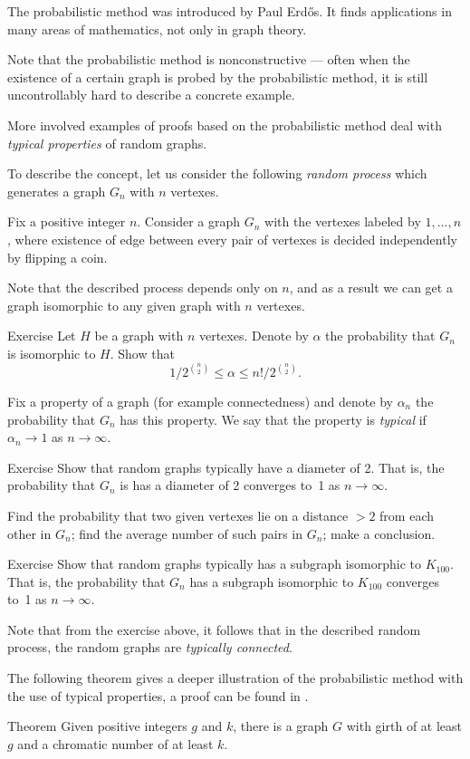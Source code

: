 The probabilistic method was introduced by Paul Erd\H os.
It finds applications in many areas of mathematics, not only in graph theory.

Note that the probabilistic method is nonconstructive ---
often when the existence of a certain graph is probed by the probabilistic method,
it is still uncontrollably hard to describe a concrete example.

More involved examples of proofs based on the probabilistic method deal with {}\emph{typical properties} of random graphs.

To describe the concept, let us consider the following {}\emph{random process} which generates a graph $G_n$ with $n$ vertexes.

Fix a positive integer $n$. 
Consider a graph $G_n$ with the vertexes labeled by $1,\dots,n$,
where existence of edge between every pair of vertexes is decided independently by flipping a coin.

Note that the described process depends only on $n$, and as a result we can get a graph isomorphic to any given graph with $n$ vertexes.

\begin{thm}{Exercise}
Let $H$ be a graph with $n$ vertexes.
Denote by $\alpha$ the probability that $G_n$ is isomorphic to $H$.
Show that 
\[1/2^{\binom n2}\le \alpha\le n!/2^{\binom n2}.\]

\end{thm}


Fix a property of a graph (for example connectedness)
and denote by $\alpha_n$ the probability that $G_n$ has this property.
We say that the property is \emph{typical} if $\alpha_n\to 1$ as $n\to \infty$.

\begin{thm}{Exercise}
Show that random graphs typically have a diameter of 2.
That is, the probability that $G_n$ is has a diameter of 2 converges to~1 as $n\to \infty$.
\end{thm}

 Find the probability that two given vertexes lie on a distance $>2$ from each other in $G_n$; find the average number of such pairs in $G_n$; make a conclusion.

\medskip

\begin{thm}{Exercise}
Show that random graphs typically has a subgraph isomorphic to $K_{100}$.
That is, the probability that $G_n$ has a subgraph isomorphic to $K_{100}$ converges to~1 as $n\to \infty$.
\end{thm}

Note that from the exercise above, it follows that in the described random process, the random graphs are {}\emph{typically connected}.

The following theorem gives a deeper illustration of the probabilistic method with the use of typical properties,
a proof can be found in \cite[Chapter 44]{aigner-ziegler}.

\begin{thm}{Theorem}
Given positive integers $g$ and $k$, there is a graph $G$ with girth of at least $g$ and a chromatic number of at least $k$.
\end{thm}
